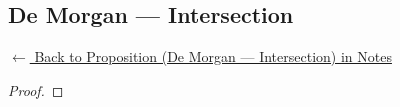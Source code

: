 
\subsection*{De Morgan --- Intersection}
\label{prf:demorgan-cap}

\begin{remark*}[Return]
\hyperref[prop:demorgan-cap]{$\leftarrow$ Back to Proposition (De Morgan --- Intersection) in Notes}
\end{remark*}

\begin{proof}
\end{proof}

\begin{remark*}

\end{remark*}

\begin{remark*}[Dependencies]

\FlashUses{}
\end{remark*}
